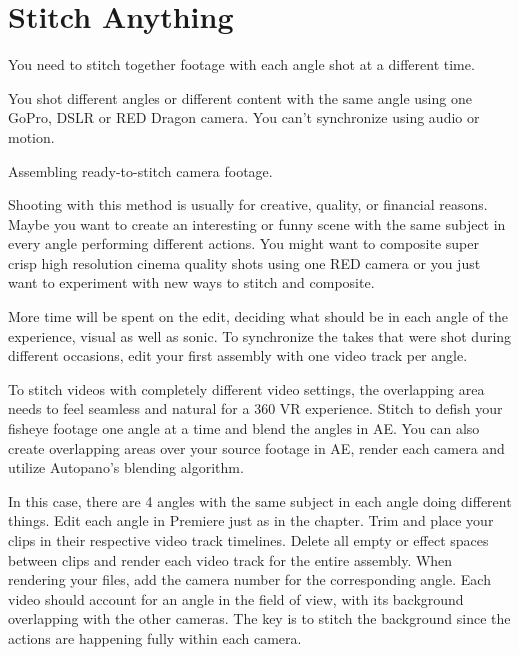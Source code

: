 \section{Stitch Anything}
\pagecolor{white}
\label{chap:49}
\begin{fullwidth}

\problem

{\large You need to stitch together footage with each angle shot at a different time. \par}

You shot different angles or different content with the same angle using one GoPro, DSLR or RED Dragon camera. You can’t synchronize using audio or motion. 

\solution

{\large Assembling ready-to-stitch camera footage. \par}

Shooting with this method is usually for creative, quality, or financial reasons. Maybe you want to create an interesting or funny scene with the same subject in every angle performing different actions. You might want to composite super crisp high resolution cinema quality shots using one RED camera or you just want to experiment with new ways to stitch and composite.

More time will be spent on the edit, deciding what should be in each angle of the experience, visual as well as sonic. To synchronize the takes that were shot during different occasions, edit your first assembly with one video track per angle. 


To stitch videos with completely different video settings, the overlapping area needs to feel seamless and natural for a 360 VR experience. Stitch to defish your fisheye footage one angle at a time and blend the angles in AE. You can also create overlapping areas over your source footage in AE, render each camera and utilize Autopano’s blending algorithm.


In this case, there are 4 angles with the same subject in each angle doing different things. Edit each angle in Premiere just as in the \textbf{} chapter. Trim and place your clips in their respective video track timelines. Delete all empty or effect spaces between clips and render each video track for the entire assembly. When rendering your files, add the camera number for the corresponding angle. Each video should account for an angle in the field of view, with its background overlapping with the other cameras. The key is to stitch the background since the actions are happening fully within each camera. 


\clearpage
\end{fullwidth}